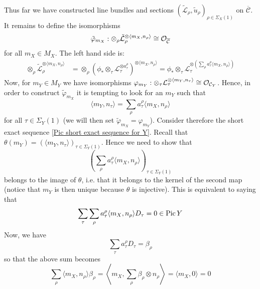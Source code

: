 Thus far we have constructed line bundles and sections $(\tilde{\mathcal L}_\rho, \tilde{u}_\rho)_{\rho \in \Sigma_X(1)}$ on $\overline{\mathcal C}$. It remains to define the isomorphisms
\begin{equation*} \tilde{\varphi}_{m_X} : \otimes_\rho \tilde{\mathcal L}_\rho^{\otimes \langle m_X, n_\rho \rangle} \cong \mathcal{O}_{\overline{\mathcal C}} \end{equation*}
for all $m_X \in M_X$. The left hand side is:
\begin{align*} \otimes_\rho \tilde{\mathcal L}_\rho^{\otimes \langle m_X, n_\rho \rangle} & = \otimes_\rho \left( \phi_* \otimes_\tau \mathcal L_\tau^{\otimes a_\tau^\rho} \right)^{\otimes \langle m_X, n_\rho \rangle} = \phi_* \otimes_\tau \mathcal L_\tau^{\otimes \left( \sum_{\rho} a_\tau^\rho  \langle m_X, n_\rho \rangle \right)} \end{align*}
Now, for $m_Y \in M_Y$ we have isomorphisms $\varphi_{m_Y} : \otimes_\tau \mathcal L_\tau^{\otimes \langle m_Y, n_\tau \rangle} \cong \mathcal{O}_{\mathcal C_Y}$. Hence, in order to construct $\tilde{\varphi}_{m_X}$ it is tempting to look for an $m_Y$ such that
\begin{equation*} \langle m_Y, n_\tau \rangle = \sum_\rho a_\tau^\rho \langle m_X, n_\rho \rangle \end{equation*}
for all $\tau \in \Sigma_Y(1)$ (we will then set $\tilde{\varphi}_{m_X} = \varphi_{m_Y}$). Consider therefore the short exact sequence \eqref{Pic short exact sequence for Y}. Recall that $\theta(m_Y) = (\langle m_Y, n_\tau \rangle)_{\tau \in \Sigma_Y(1)}$. Hence we need to show that
\begin{equation*} \left( \sum_\rho a_\tau^\rho \langle m_X, n_\rho \rangle \right)_{\tau \in \Sigma_Y(1)} \end{equation*}
belongs to the image of $\theta$, i.e. that it belongs to the kernel of the second map (notice that $m_Y$ is then unique because $\theta$ is injective). This is equivalent to saying that
\begin{equation*} \sum_\tau \sum_\rho a_\tau^\rho \langle m_X, n_\rho \rangle D_\tau = 0 \in \operatorname{Pic} Y \end{equation*}
Now, we have
\begin{equation*} \sum_\tau a_\tau^\rho D_\tau = \beta_\rho \end{equation*}
so that the above sum becomes
\begin{equation*} \sum_\rho \langle m_X, n_\rho \rangle \beta_\rho = \left\langle m_X, \sum_\rho \beta_\rho \otimes n_\rho \right \rangle = \langle m_X, 0 \rangle = 0 \end{equation*}
